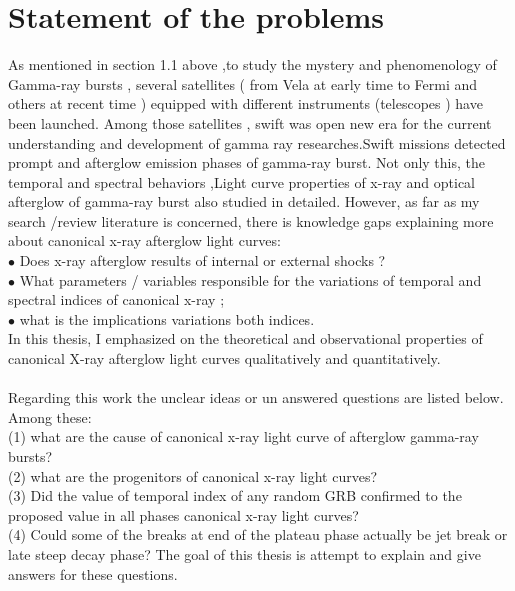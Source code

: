 \section{Statement of the problems}
As mentioned in section 1.1 above ,to study the mystery and  phenomenology of Gamma-ray bursts , several  satellites ( from Vela at early time  to  Fermi and others at recent time ) equipped  with different instruments (telescopes ) have been launched. Among those satellites , swift was open new era  for the current understanding and development of gamma ray researches.Swift missions  detected  prompt and  afterglow emission phases of gamma-ray burst. Not only this, the  temporal and spectral behaviors ,Light curve  properties of x-ray and optical afterglow of  gamma-ray burst also studied in detailed. However, as far as my search /review literature is concerned, there is  knowledge gaps  explaining more about canonical x-ray afterglow light curves:\\
$\bullet$ Does x-ray afterglow results of internal or external shocks ?  \\
$\bullet$ What parameters / variables responsible for the variations of temporal and spectral indices  of canonical x-ray ;\\
$\bullet$ what is the implications variations both indices.\\
In this thesis, I emphasized on the theoretical and observational properties of canonical X-ray afterglow light curves  qualitatively and quantitatively.\\\\
Regarding this work the unclear ideas or un answered questions are listed below. Among these:\\
(1) what are the cause of canonical x-ray light curve of afterglow gamma-ray bursts?\\
(2) what are the progenitors of canonical x-ray light curves?\\
(3) Did the  value  of temporal index  of any random GRB confirmed to the proposed value in all phases canonical x-ray light curves?\\
(4) Could some of the breaks at  end of the plateau phase actually be jet break or late steep decay phase? The goal of this thesis is  attempt to explain and give answers for these questions.
